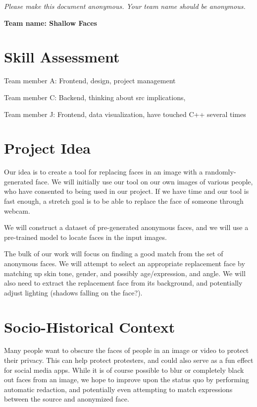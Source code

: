 \emph{Please make this document anonymous. Your team name should be anonymous.}

\textbf{Team name: Shallow Faces}

\section*{Skill Assessment}


Team member A: Frontend, design, project management

Team member C: Backend, thinking about src implications,

Team member J: Frontend, data visualization, have touched C++ several times


\section*{Project Idea}

Our idea is to create a tool for replacing faces in an image with a randomly-generated face. We will initially use our tool on our own images of various people, who have consented to being used in our project. If we have time and our tool is fast enough, a stretch goal is to be able to replace the face of someone through webcam.

We will construct a dataset of pre-generated anonymous faces, and we will use a pre-trained model to locate faces in the input images.

The bulk of our work will focus on finding a good match from the set of anonymous faces. We will attempt to select an appropriate replacement face by matching up skin tone, gender, and possibly age/expression, and angle. We will also need to extract the replacement face from its background, and potentially adjust lighting (shadows falling on the face?).

\section*{Socio-Historical Context}

Many people want to obscure the faces of people in an image or video to protect their privacy. This can help protect protesters, and could also serve as a fun effect for social media apps. While it is of course possible to blur or completely black out faces from an image, we hope to improve upon the status quo by performing automatic redaction, and potentially even attempting to match expressions between the source and anonymized face.

